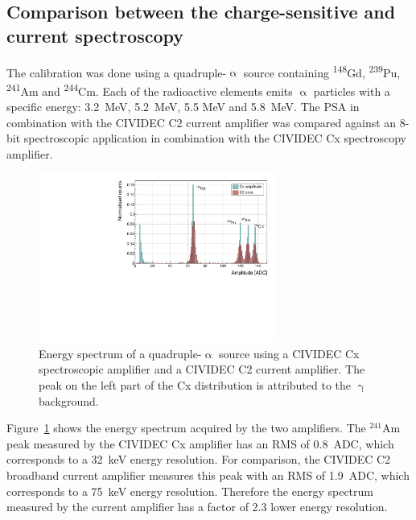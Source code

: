 \subsection{Comparison between the charge-sensitive and current spectroscopy}
The calibration was done using a quadruple-$\upalpha$ source containing \textsuperscript{148}Gd, \textsuperscript{239}Pu, \textsuperscript{241}Am and \textsuperscript{244}Cm. Each of the radioactive elements emits $\upalpha$ particles with a specific energy: 3.2~MeV, 5.2~MeV, 5.5 MeV and 5.8~MeV. The PSA in combination with the CIVIDEC C2 current amplifier was compared against an 8-bit spectroscopic application in combination with the CIVIDEC Cx spectroscopy amplifier.%

\begin{figure}[!t]
\centering
\includegraphics[width=0.7\textwidth]{../scripts/05_current_monitoring/plot4alpha/plots/4alphaCompare}
\caption{Energy spectrum of a quadruple-$\upalpha$ source using a CIVIDEC Cx spectroscopic amplifier and a CIVIDEC C2 current amplifier. The peak on the left part of the Cx distribution is attributed to the $\upgamma$ background.}
\label{fig:c2cx4alpha}
\end{figure}

Figure~\ref{fig:c2cx4alpha} shows the energy spectrum acquired by the two amplifiers. The $^{241}$Am peak measured by the CIVIDEC Cx amplifier has an RMS of 0.8~ADC, which corresponds to a 32~keV energy resolution. For comparison, the CIVIDEC C2 broadband current amplifier measures this peak with an RMS of 1.9~ADC, which corresponds to a 75~keV energy resolution. Therefore the energy spectrum measured by the current amplifier has a factor of 2.3 lower energy resolution.










